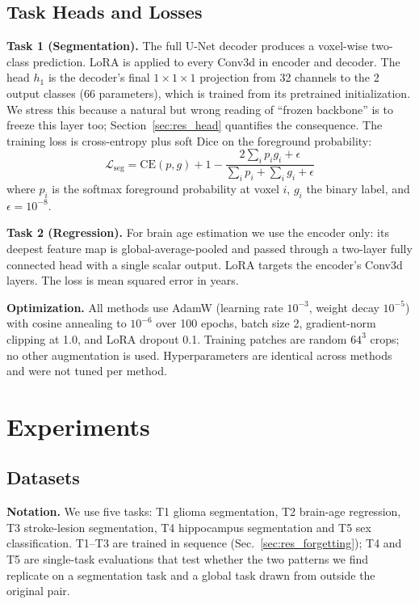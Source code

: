 \documentclass[journal,twoside,web]{ieeecolor}
\begin{document}
\subsection{Task Heads and Losses}
\label{sec:heads}

\textbf{Task 1 (Segmentation).} The full U-Net decoder produces a voxel-wise two-class prediction. LoRA is applied to every Conv3d in encoder and decoder. The head $h_1$ is the decoder's final $1{\times}1{\times}1$ projection from 32 channels to the 2 output classes (66 parameters), which is trained from its pretrained initialization. We stress this because a natural but wrong reading of ``frozen backbone'' is to freeze this layer too; Section~\ref{sec:res_head} quantifies the consequence. The training loss is cross-entropy plus soft Dice on the foreground probability:
\begin{equation}
\mathcal{L}_{\text{seg}} = \text{CE}(p, g) + 1 - \frac{2 \sum_i p_i g_i + \epsilon}{\sum_i p_i + \sum_i g_i + \epsilon}
\end{equation}
where $p_i$ is the softmax foreground probability at voxel $i$, $g_i$ the binary label, and $\epsilon=10^{-8}$.

\textbf{Task 2 (Regression).} For brain age estimation we use the encoder only: its deepest feature map is global-average-pooled and passed through a two-layer fully connected head with a single scalar output. LoRA targets the encoder's Conv3d layers. The loss is mean squared error in years.

\textbf{Optimization.} All methods use AdamW (learning rate $10^{-3}$, weight decay $10^{-5}$) with cosine annealing to $10^{-6}$ over 100 epochs, batch size 2, gradient-norm clipping at 1.0, and LoRA dropout 0.1. Training patches are random $64^3$ crops; no other augmentation is used. Hyperparameters are identical across methods and were not tuned per method.

\section{Experiments}
\label{sec:experiments}

\subsection{Datasets}
\label{sec:data}

\textbf{Notation.} We use five tasks: T1 glioma segmentation, T2 brain-age regression, T3 stroke-lesion segmentation, T4 hippocampus segmentation and T5 sex classification. T1--T3 are trained in sequence (Sec.~\ref{sec:res_forgetting}); T4 and T5 are single-task evaluations that test whether the two patterns we find replicate on a segmentation task and a global task drawn from outside the original pair.
\end{document}
